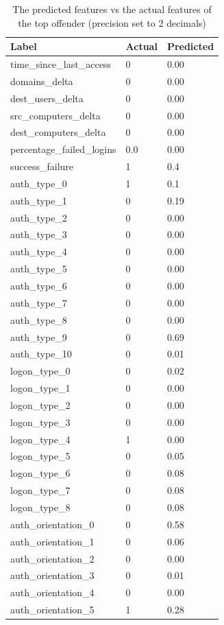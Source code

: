 \begin{table}[htbp]
	\centering
	\caption{The predicted features vs the actual features of the top offender (precision set to 2 decimals)}\label{tab:predicted_vs_actual_top}
	\begin{tabular}{lll}
		Label & Actual & Predicted \\ \midrule
		time\_since\_last\_access & 0 & 0.00 \\
		domains\_delta & 0 & 0.00 \\
		dest\_users\_delta & 0 & 0.00 \\
		src\_computers\_delta & 0 & 0.00 \\
		dest\_computers\_delta & 0 & 0.00 \\
		percentage\_failed\_logins & 0.0 & 0.00 \\
		success\_failure & 1 & 0.4 \\
		auth\_type\_0 & 1 & 0.1 \\
		auth\_type\_1 & 0 & 0.19 \\
		auth\_type\_2 & 0 & 0.00 \\
		auth\_type\_3 & 0 & 0.00 \\
		auth\_type\_4 & 0 & 0.00 \\
		auth\_type\_5 & 0 & 0.00 \\
		auth\_type\_6 & 0 & 0.00 \\
		auth\_type\_7 & 0 & 0.00 \\
		auth\_type\_8 & 0 & 0.00 \\
		auth\_type\_9 & 0 & 0.69 \\
		auth\_type\_10 & 0 & 0.01 \\
		logon\_type\_0 & 0 & 0.02 \\
		logon\_type\_1 & 0 & 0.00 \\
		logon\_type\_2 & 0 & 0.00 \\
		logon\_type\_3 & 0 & 0.00 \\
		logon\_type\_4 & 1 & 0.00 \\
		logon\_type\_5 & 0 & 0.05 \\
		logon\_type\_6 & 0 & 0.08 \\
		logon\_type\_7 & 0 & 0.08 \\
		logon\_type\_8 & 0 & 0.08 \\
		auth\_orientation\_0 & 0 & 0.58 \\
		auth\_orientation\_1 & 0 & 0.06 \\
		auth\_orientation\_2 & 0 & 0.00 \\
		auth\_orientation\_3 & 0 & 0.01 \\
		auth\_orientation\_4 & 0 & 0.00 \\
		auth\_orientation\_5 & 1 & 0.28
	\end{tabular}
\end{table}

